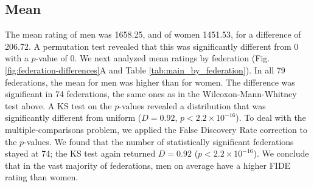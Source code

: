 \documentclass[9pt,twocolumn,twoside,lineno]{pnas-new}
\begin{document}
\subsection*{Mean}
The mean rating of men was 1658.25, and of women 1451.53, for a difference of 206.72.  A permutation test revealed that this was significantly different from 0 with a $p$-value of 0.  We next analyzed mean ratings by federation (Fig. \ref{fig:federation-differences}A and Table \ref{tab:main_by_federation}). In all 79 federations, the mean for men was higher than for women. The difference was significant in 74  federations, the same ones as in the Wilcoxon-Mann-Whitney test above. A KS test on the $p$-values revealed a distribution that was significantly different from uniform ($D = 0.92$, $p < 2.2\times 10^{-16}$). To deal with the multiple-comparisons problem, we applied the False Discovery Rate correction \cite{BH95} to the $p$-values. We found that the number of statistically significant federations stayed at 74; the KS test again returned $D = 0.92$ ($p < 2.2\times 10^{-16}$). We conclude that in the vast majority of federations, men on average have a higher FIDE rating than women.
\end{document}
